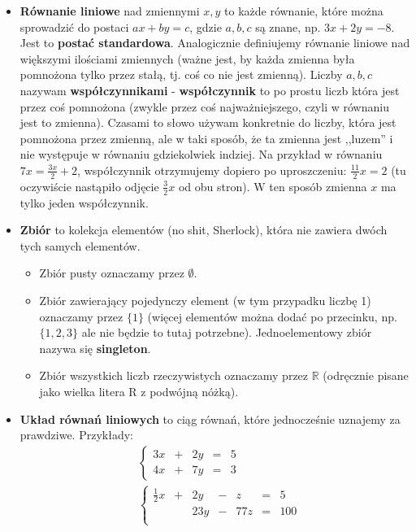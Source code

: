 \documentclass{article}
\theoremstyle{remark}
\begin{document}
\begin{itemize}
  \item \textbf{Równanie liniowe} nad zmiennymi $x, y$
  to każde równanie, które można sprowadzić do postaci
  $ax + by = c$, gdzie $a, b, c$ są znane, np. $3x+2y=-8$.
  Jest to \textbf{postać standardowa}.
  Analogicznie definiujemy równanie liniowe
  nad większymi ilościami zmiennych
  (ważne jest, by każda zmienna była pomnożona tylko przez
   stałą, tj. coś co nie jest zmienną).
  \subitem Liczby $a, b, c$ nazywam \textbf{współczynnikami} -
  \textbf{współczynnik} to po prostu liczb która jest przez coś pomnożona
  (zwykle przez coś najważniejszego, czyli w równaniu jest to zmienna).
  Czasami to słowo używam konkretnie do liczby, która jest pomnożona przez zmienną,
  ale w taki sposób, że ta zmienna jest ,,luzem'' i nie występuje w równaniu gdziekolwiek indziej.
  Na przykład w równaniu $7x = \tfrac{3x}2 + 2$, współczynnik otrzymujemy dopiero po uproszczeniu:
  $\frac{11}2x = 2$ (tu oczywiście nastąpiło odjęcie $\frac32x$ od obu stron).
  W ten sposób zmienna $x$ ma tylko jeden współczynnik.
  \item \textbf{Zbiór} to kolekcja elementów (no shit, Sherlock),
    która nie zawiera dwóch tych samych elementów.
  \begin{itemize}
    \item Zbiór pusty oznaczamy przez $\emptyset$.
    \item Zbiór zawierający pojedynczy element (w tym przypadku liczbę 1)
  oznaczamy przez $\{1\}$ (więcej elementów można dodać po przecinku, np. $\{1, 2, 3\}$
  ale nie będzie to tutaj potrzebne). Jednoelementowy zbiór nazywa się \textbf{singleton}.
    \item Zbiór wszystkich liczb rzeczywistych oznaczamy przez $\mathbb R$
  (odręcznie pisane jako wielka litera R z podwójną nóżką).
  \end{itemize}
  \item \textbf{Układ równań liniowych} to ciąg równań, które jednocześnie uznajemy za prawdziwe.
  Przykłady:
  \begin{align*}
    &\left\{
    \begin{array}{lllll}
      3x &+& 2y &=& 5\\
      4x &+& 7y &=& 3
    \end{array}
    \right. \\
    &\left\{
    \begin{array}{lllllll}
      \tfrac12x &+& 2y &-&z &=& 5\\
       && 23y &-&77z &=& 100\\

\end{array}
\end{align*}
\end{itemize}
\end{document}
